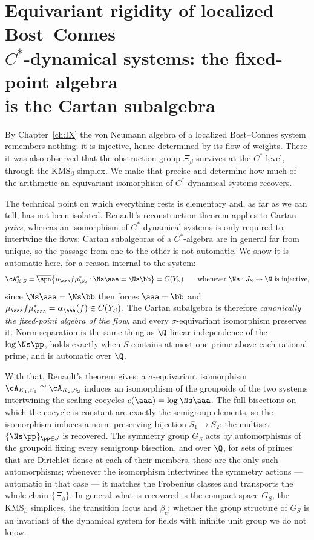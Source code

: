 \chapter[The fixed-point algebra is the Cartan subalgebra]{Equivariant rigidity of localized Bost--Connes\\ $C^*$-dynamical systems: the fixed-point algebra\\ is the Cartan subalgebra}\label{ch:XIII}
\begin{summary}
By Chapter~\ref{ch:IX} the von Neumann algebra of a localized Bost--Connes system
remembers nothing: it is injective, hence determined by its flow of weights. There it was
also observed that the obstruction group $\Xi_\beta$ survives at the $C^*$-level, through
the $\mathrm{KMS}_\beta$ simplex. We make that precise and determine how much of the
arithmetic an equivariant isomorphism of $C^*$-dynamical systems recovers.

The technical point on which everything rests is elementary and, as far as we can tell, has
not been isolated. Renault's reconstruction theorem applies to Cartan \emph{pairs}, whereas
an isomorphism of $C^*$-dynamical systems is only required to intertwine the flows; Cartan
subalgebras of a $C^*$-algebra are in general far from unique, so the passage from one to the
other is not automatic. We show it is automatic here, for a reason internal to the system:
\[
\cA_{K,S}^{\sigma}=\overline{\spn}\bigl\{\mu_\aaa f\mu_\bb^*:\Ns\aaa=\Ns\bb\bigr\}
=C(Y_S)\qquad\text{whenever }\Ns:J_S\to\N\text{ is injective,}
\]
since $\Ns\aaa=\Ns\bb$ then forces $\aaa=\bb$ and $\mu_\aaa f\mu_\aaa^*=\alpha_\aaa(f)\in C(Y_S)$.
The Cartan subalgebra is therefore \emph{canonically the fixed-point algebra of the flow},
and every $\sigma$-equivariant isomorphism preserves it. Norm-separation is the same thing
as $\Q$-linear independence of the $\log\Ns\pp$, holds exactly when $S$ contains at most one
prime above each rational prime, and is automatic over $\Q$.

With that, Renault's theorem gives: a $\sigma$-equivariant isomorphism
$\cA_{K_1,S_1}\cong\cA_{K_2,S_2}$ induces an isomorphism of the groupoids of the two systems
intertwining the scaling cocycles $c(\aaa)=\log\Ns\aaa$. The full bisections on which the
cocycle is constant are exactly the semigroup elements, so the isomorphism induces a
norm-preserving bijection $S_1\to S_2$: the multiset $\{\Ns\pp\}_{\pp\in S}$ is recovered. The
symmetry group $G_S$ acts by automorphisms of the groupoid fixing every semigroup
bisection, and over $\Q$, for sets of primes that are Dirichlet-dense at each of their
members, these are the only such automorphisms; whenever the isomorphism intertwines the
symmetry actions --- automatic in that case --- it matches the Frobenius classes and
transports the whole chain $\{\Xi_\beta\}$. In general what is recovered is the compact
space $G_S$, the $\mathrm{KMS}_\beta$ simplices, the transition locus and $\beta_c$; whether the
group structure of $G_S$ is an invariant of the dynamical system for fields with infinite
unit group we do not know.


\end{summary}
